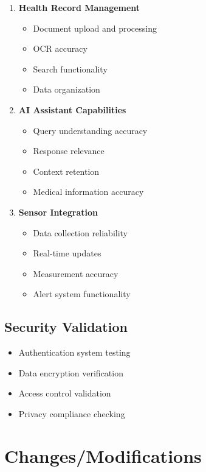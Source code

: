 \begin{enumerate}
    \item \textbf{Health Record Management}
    \begin{itemize}
        \item Document upload and processing
        \item OCR accuracy
        \item Search functionality
        \item Data organization
    \end{itemize}

    \item \textbf{AI Assistant Capabilities}
    \begin{itemize}
        \item Query understanding accuracy
        \item Response relevance
        \item Context retention
        \item Medical information accuracy
    \end{itemize}

    \item \textbf{Sensor Integration}
    \begin{itemize}
        \item Data collection reliability
        \item Real-time updates
        \item Measurement accuracy
        \item Alert system functionality
    \end{itemize}
\end{enumerate}

\subsection{Security Validation}
\begin{itemize}
    \item Authentication system testing
    \item Data encryption verification
    \item Access control validation
    \item Privacy compliance checking
\end{itemize}

\section{Changes/Modifications}
